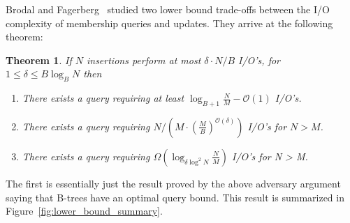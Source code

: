 \documentclass[twoside,11pt,openright]{report}
\newtheorem{theorem}{Theorem}
\begin{document}
Brodal and Fagerberg~\cite{Brodal:2003:LBE:644108.644201} studied two lower bound trade-offs between the I/O complexity of membership queries and updates. They arrive at the following theorem:
\begin{theorem}
If $N$ insertions perform at most $\delta \cdot N/B$ I/O's, for $1 \leq \delta \leq B \log_B N$ then
\begin{enumerate}
	\item There exists a query requiring at least $\log_{B+1} \frac{N}{M} - \mathcal{O}(1)$ I/O's.
	\item There exists a query requiring $N/(M\cdot (\frac{M}{B})^{\mathcal{O}(\delta)})$ I/O's for $N > M$.
	\item There exists a query requiring $\Omega(\log_{\delta \log^2 N} \frac{N}{M})$ I/O's for N > M.
\end{enumerate}
\end{theorem}

The first is essentially just the result proved by the above adversary argument saying that B-trees have an optimal query bound. This result is summarized in Figure~\ref{fig:lower_bound_summary}.
\end{document}
